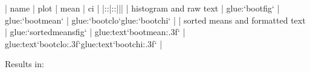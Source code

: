 \documentclass[letterpaper,10pt,english]{jupyterBook}
\begin{document}
\begin{sphinxVerbatim}[commandchars=\\\{\}]
| name                            |       plot                    | mean                      | ci                                                |
|:\PYGZhy{}\PYGZhy{}\PYGZhy{}\PYGZhy{}\PYGZhy{}\PYGZhy{}\PYGZhy{}\PYGZhy{}\PYGZhy{}\PYGZhy{}\PYGZhy{}\PYGZhy{}\PYGZhy{}\PYGZhy{}\PYGZhy{}\PYGZhy{}\PYGZhy{}\PYGZhy{}\PYGZhy{}\PYGZhy{}\PYGZhy{}\PYGZhy{}\PYGZhy{}\PYGZhy{}\PYGZhy{}\PYGZhy{}\PYGZhy{}\PYGZhy{}\PYGZhy{}\PYGZhy{}\PYGZhy{}:|:\PYGZhy{}\PYGZhy{}\PYGZhy{}\PYGZhy{}\PYGZhy{}\PYGZhy{}\PYGZhy{}\PYGZhy{}\PYGZhy{}\PYGZhy{}\PYGZhy{}\PYGZhy{}\PYGZhy{}\PYGZhy{}\PYGZhy{}\PYGZhy{}\PYGZhy{}\PYGZhy{}\PYGZhy{}\PYGZhy{}\PYGZhy{}\PYGZhy{}\PYGZhy{}\PYGZhy{}\PYGZhy{}\PYGZhy{}\PYGZhy{}\PYGZhy{}\PYGZhy{}:|\PYGZhy{}\PYGZhy{}\PYGZhy{}\PYGZhy{}\PYGZhy{}\PYGZhy{}\PYGZhy{}\PYGZhy{}\PYGZhy{}\PYGZhy{}\PYGZhy{}\PYGZhy{}\PYGZhy{}\PYGZhy{}\PYGZhy{}\PYGZhy{}\PYGZhy{}\PYGZhy{}\PYGZhy{}\PYGZhy{}\PYGZhy{}\PYGZhy{}\PYGZhy{}\PYGZhy{}\PYGZhy{}\PYGZhy{}\PYGZhy{}|\PYGZhy{}\PYGZhy{}\PYGZhy{}\PYGZhy{}\PYGZhy{}\PYGZhy{}\PYGZhy{}\PYGZhy{}\PYGZhy{}\PYGZhy{}\PYGZhy{}\PYGZhy{}\PYGZhy{}\PYGZhy{}\PYGZhy{}\PYGZhy{}\PYGZhy{}\PYGZhy{}\PYGZhy{}\PYGZhy{}\PYGZhy{}\PYGZhy{}\PYGZhy{}\PYGZhy{}\PYGZhy{}\PYGZhy{}\PYGZhy{}\PYGZhy{}\PYGZhy{}\PYGZhy{}\PYGZhy{}\PYGZhy{}\PYGZhy{}\PYGZhy{}\PYGZhy{}\PYGZhy{}\PYGZhy{}\PYGZhy{}\PYGZhy{}\PYGZhy{}\PYGZhy{}\PYGZhy{}\PYGZhy{}\PYGZhy{}\PYGZhy{}\PYGZhy{}\PYGZhy{}\PYGZhy{}\PYGZhy{}\PYGZhy{}\PYGZhy{}|
| histogram and raw text          | \PYGZob{}glue:\PYGZcb{}`boot\PYGZus{}fig`             | \PYGZob{}glue:\PYGZcb{}`boot\PYGZus{}mean`          | \PYGZob{}glue:\PYGZcb{}`boot\PYGZus{}clo`\PYGZhy{}\PYGZob{}glue:\PYGZcb{}`boot\PYGZus{}chi`                   |
| sorted means and formatted text | \PYGZob{}glue:\PYGZcb{}`sorted\PYGZus{}means\PYGZus{}fig`     | \PYGZob{}glue:text\PYGZcb{}`boot\PYGZus{}mean:.3f` | \PYGZob{}glue:text\PYGZcb{}`boot\PYGZus{}clo:.3f`\PYGZhy{}\PYGZob{}glue:text\PYGZcb{}`boot\PYGZus{}chi:.3f` |
\end{sphinxVerbatim}

\sphinxAtStartPar
Results in:
\end{document}
